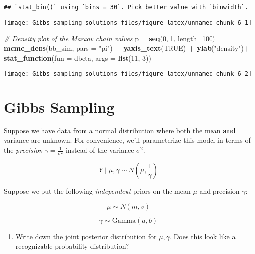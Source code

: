 \documentclass[
]{article}
\newenvironment{Shaded}{\begin{snugshade}}{\end{snugshade}}
\newcommand{\CommentTok}[1]{\textcolor[rgb]{0.56,0.35,0.01}{\textit{#1}}}
\newcommand{\DataTypeTok}[1]{\textcolor[rgb]{0.13,0.29,0.53}{#1}}
\newcommand{\DecValTok}[1]{\textcolor[rgb]{0.00,0.00,0.81}{#1}}
\newcommand{\KeywordTok}[1]{\textcolor[rgb]{0.13,0.29,0.53}{\textbf{#1}}}
\newcommand{\NormalTok}[1]{#1}
\newcommand{\OperatorTok}[1]{\textcolor[rgb]{0.81,0.36,0.00}{\textbf{#1}}}
\newcommand{\OtherTok}[1]{\textcolor[rgb]{0.56,0.35,0.01}{#1}}
\newcommand{\StringTok}[1]{\textcolor[rgb]{0.31,0.60,0.02}{#1}}
\providecommand{\tightlist}{%
  \setlength{\itemsep}{0pt}\setlength{\parskip}{0pt}}
\begin{document}
\begin{verbatim}
## `stat_bin()` using `bins = 30`. Pick better value with `binwidth`.
\end{verbatim}

\texttt{[image: Gibbs-sampling-solutions\_files/figure-latex/unnamed-chunk-6-1]}

\begin{Shaded}
\begin{Highlighting}[]
\CommentTok{# Density plot of the Markov chain values}
\NormalTok{p =}\StringTok{ }\KeywordTok{seq}\NormalTok{(}\DecValTok{0}\NormalTok{, }\DecValTok{1}\NormalTok{, }\DataTypeTok{length=}\DecValTok{100}\NormalTok{)}
\KeywordTok{mcmc_dens}\NormalTok{(bb_sim, }\DataTypeTok{pars =} \StringTok{"pi"}\NormalTok{) }\OperatorTok{+}\StringTok{ }
\StringTok{  }\KeywordTok{yaxis_text}\NormalTok{(}\OtherTok{TRUE}\NormalTok{) }\OperatorTok{+}\StringTok{ }
\StringTok{  }\KeywordTok{ylab}\NormalTok{(}\StringTok{"density"}\NormalTok{)}\OperatorTok{+}
\StringTok{  }\KeywordTok{stat_function}\NormalTok{(}\DataTypeTok{fun =}\NormalTok{ dbeta, }\DataTypeTok{args =} \KeywordTok{list}\NormalTok{(}\DecValTok{11}\NormalTok{, }\DecValTok{3}\NormalTok{)) }
\end{Highlighting}
\end{Shaded}

\texttt{[image: Gibbs-sampling-solutions\_files/figure-latex/unnamed-chunk-6-2]}

\hypertarget{gibbs-sampling}{%
\section{Gibbs Sampling}\label{gibbs-sampling}}

Suppose we have data from a normal distribution where both the mean
\textbf{and} variance are unknown. For convenience, we'll parameterize
this model in terms of the \emph{precision}
\(\gamma = \frac{1}{\sigma^2}\) instead of the variance \(\sigma^2\).

\[Y \mid \mu, \gamma \sim N\left(\mu, \frac{1}{\gamma}\right)\]

Suppose we put the following \emph{independent} priors on the mean
\(\mu\) and precision \(\gamma\):

\[\mu \sim N(m, v)\]

\[\gamma \sim \text{Gamma}(a,b)\]

\begin{enumerate}
\def\labelenumi{\arabic{enumi}.}
\tightlist
\item
  Write down the joint posterior distribution for \(\mu, \gamma\). Does
  this look like a recognizable probability distribution?
\end{enumerate}
\end{document}

